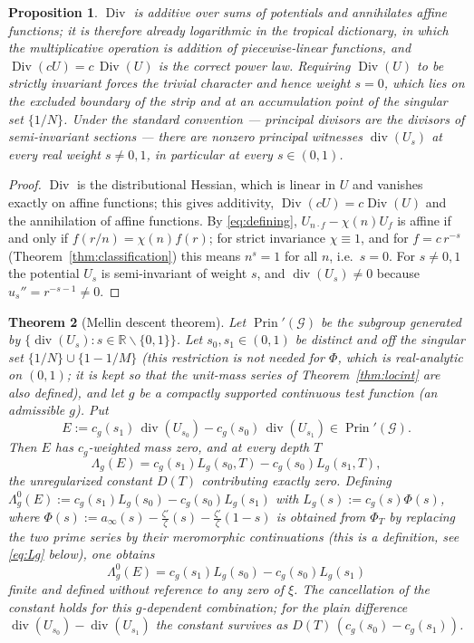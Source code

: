 \documentclass[11pt]{amsart}
\newtheorem{theorem}{Theorem}[section]
\newtheorem{proposition}[theorem]{Proposition}
\theoremstyle{definition}
\theoremstyle{remark}
\newcommand{\R}{\mathbb R}
\newcommand{\Div}{\operatorname{Div}}
\newcommand{\divv}{\operatorname{div}}
\newcommand{\Prin}{\operatorname{Prin}}
\newcommand{\Gr}{\mathcal G}
\begin{document}
\begin{proposition}\label{prop:semiinv}
$\Div$ is additive over sums of potentials and annihilates affine functions;
it is therefore already logarithmic in the tropical dictionary, in which the
multiplicative operation is addition of piecewise-linear functions, and
$\Div(cU)=c\,\Div(U)$ is the correct power law.  Requiring $\Div(U)$ to be
strictly invariant forces the trivial character and hence weight $s=0$, which
lies on the excluded boundary of the strip and at an accumulation point of
the singular set $\{1/N\}$.  Under the standard convention --- principal
divisors are the divisors of semi-invariant sections --- there are nonzero
principal witnesses $\divv(U_s)$ at every real weight $s\neq0,1$, in
particular at every $s\in(0,1)$.
\end{proposition}

\begin{proof}
$\Div$ is the distributional Hessian, which is linear in $U$ and vanishes
exactly on affine functions; this gives additivity, $\Div(cU)=c\Div(U)$
and the annihilation of affine functions.  By \eqref{eq:defining},
$U_{n\cdot f}-\chi(n)U_f$ is affine if and only if
$f(r/n)=\chi(n)f(r)$; for strict invariance $\chi\equiv1$, and for
$f=c\,r^{-s}$ (Theorem~\ref{thm:classification}) this means $n^{s}=1$ for
all $n$, i.e.\ $s=0$.  For $s\neq0,1$ the potential $U_s$ is
semi-invariant of weight $s$, and $\divv(U_s)\neq0$ because
$u_s''=r^{-s-1}\neq0$.
\end{proof}

\begin{theorem}[Mellin descent theorem]\label{thm:mellindescent}
Let $\Prin'(\Gr)$ be the subgroup generated by
$\{\divv(U_s):s\in\R\smallsetminus\{0,1\}\}$.  Let $s_0,s_1\in(0,1)$ be
distinct and off the singular set $\{1/N\}\cup\{1-1/M\}$ (this restriction is
not needed for $\Phi$, which is real-analytic on $(0,1)$; it is kept so that
the unit-mass series of Theorem~\ref{thm:locint} are also defined), and let $g$ be a
compactly supported continuous test function (an \emph{admissible} $g$).
Put
\[
 E:=c_g(s_1)\,\divv(U_{s_0})-c_g(s_0)\,\divv(U_{s_1})\in\Prin'(\Gr).
\]
Then $E$ has $c_g$-weighted mass zero, and at every depth $T$
\[
 \Lambda_g(E)=c_g(s_1)L_g(s_0,T)-c_g(s_0)L_g(s_1,T),
\]
the unregularized constant $D(T)$ contributing exactly zero.  Defining
$\Lambda_g^{0}(E):=c_g(s_1)L_g(s_0)-c_g(s_0)L_g(s_1)$ with
$L_g(s):=c_g(s)\Phi(s)$, where
$\Phi(s):=a_\infty(s)-\frac{\zeta'}{\zeta}(s)-\frac{\zeta'}{\zeta}(1-s)$ is
obtained from $\Phi_T$ by replacing the two prime series by their
meromorphic continuations (this is a definition, see \eqref{eq:Lg} below),
one obtains
\[
 \boxed{\;
 \Lambda_g^{0}(E)=c_g(s_1)L_g(s_0)-c_g(s_0)L_g(s_1)\;}
\]
finite and defined without reference to any zero of $\xi$.  The
cancellation of the constant holds for this $g$-dependent combination; for
the plain difference $\divv(U_{s_0})-\divv(U_{s_1})$ the constant survives
as $D(T)\,(c_g(s_0)-c_g(s_1))$.
\end{theorem}
\end{document}
